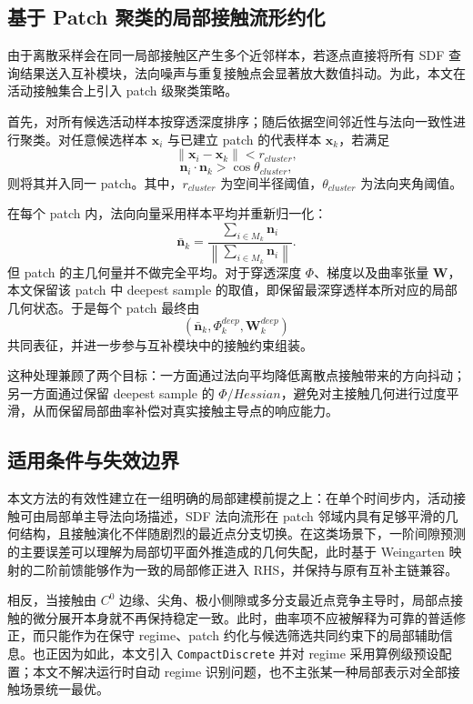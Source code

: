 \subsection{基于 Patch 聚类的局部接触流形约化}

由于离散采样会在同一局部接触区产生多个近邻样本，若逐点直接将所有 SDF 查询结果送入互补模块，法向噪声与重复接触点会显著放大数值抖动。为此，本文在活动接触集合上引入 patch 级聚类策略。

首先，对所有候选活动样本按穿透深度排序；随后依据空间邻近性与法向一致性进行聚类。对任意候选样本 $\mathbf{x}_i$ 与已建立 patch 的代表样本 $\mathbf{x}_k$，若满足
\begin{equation}
    \|\mathbf{x}_i - \mathbf{x}_k\| < r_{cluster},
\end{equation}
\begin{equation}
    \mathbf{n}_i \cdot \mathbf{n}_k > \cos \theta_{cluster},
\end{equation}
则将其并入同一 patch。其中，$r_{cluster}$ 为空间半径阈值，$\theta_{cluster}$ 为法向夹角阈值。

在每个 patch 内，法向向量采用样本平均并重新归一化：
\begin{equation}
    \bar{\mathbf{n}}_k =
    \frac{\sum_{i \in M_k} \mathbf{n}_i}
         {\left\|\sum_{i \in M_k} \mathbf{n}_i\right\|}.
\end{equation}
但 patch 的主几何量并不做完全平均。对于穿透深度 $\Phi$、梯度以及曲率张量 $\mathbf{W}$，本文保留该 patch 中 deepest sample 的取值，即保留最深穿透样本所对应的局部几何状态。于是每个 patch 最终由
\begin{equation}
    \left(\bar{\mathbf{n}}_k, \Phi_k^{deep}, \mathbf{W}_k^{deep}\right)
\end{equation}
共同表征，并进一步参与互补模块中的接触约束组装。

这种处理兼顾了两个目标：一方面通过法向平均降低离散点接触带来的方向抖动；另一方面通过保留 deepest sample 的 $\Phi/Hessian$，避免对主接触几何进行过度平滑，从而保留局部曲率补偿对真实接触主导点的响应能力。

\subsection{适用条件与失效边界}

本文方法的有效性建立在一组明确的局部建模前提之上：在单个时间步内，活动接触可由局部单主导法向场描述，SDF 法向流形在 patch 邻域内具有足够平滑的几何结构，且接触演化不伴随剧烈的最近点分支切换。在这类场景下，一阶间隙预测的主要误差可以理解为局部切平面外推造成的几何失配，此时基于 Weingarten 映射的二阶前馈能够作为一致的局部修正进入 RHS，并保持与原有互补主链兼容。

相反，当接触由 $C^0$ 边缘、尖角、极小侧隙或多分支最近点竞争主导时，局部点接触的微分展开本身就不再保持稳定一致。此时，曲率项不应被解释为可靠的普适修正，而只能作为在保守 regime、patch 约化与候选筛选共同约束下的局部辅助信息。也正因为如此，本文引入 \texttt{CompactDiscrete} 并对 regime 采用算例级预设配置；本文不解决运行时自动 regime 识别问题，也不主张某一种局部表示对全部接触场景统一最优。
